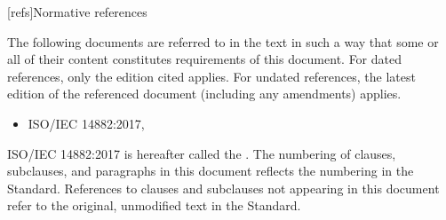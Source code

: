 
[refs]{Normative references}

\pnum

The following documents are referred to in the text in such a way
that some or all of their content constitutes requirements of this
document. For dated references, only the edition cited applies.
 For undated references, the latest edition
 of the referenced document (including any amendments) applies.

 \begin{itemize}
 \item ISO/IEC 14882:2017, 
 \end{itemize}

ISO/IEC 14882:2017 is hereafter called the .
 The numbering of clauses, subclauses, and paragraphs in this document
 reflects the numbering in the \Cpp Standard. References to clauses
 and subclauses not appearing in this document refer to
 the original, unmodified text in the \Cpp Standard.

